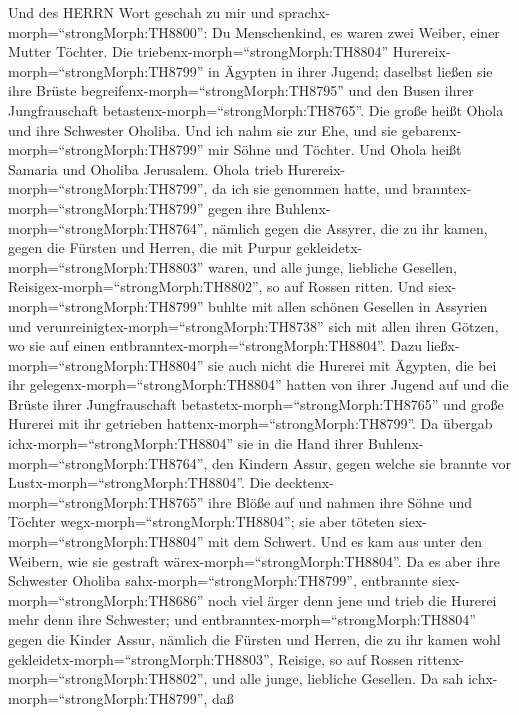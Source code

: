  Und des HERRN Wort geschah zu mir und
sprachx-morph=``strongMorph:TH8800'':  Du Menschenkind, es
waren zwei Weiber, einer Mutter Töchter.  Die
triebenx-morph=``strongMorph:TH8804''
Hurereix-morph=``strongMorph:TH8799'' in Ägypten in ihrer Jugend;
daselbst ließen sie ihre Brüste begreifenx-morph=``strongMorph:TH8795''
und den Busen ihrer Jungfrauschaft
betastenx-morph=``strongMorph:TH8765''.  Die große heißt
Ohola und ihre Schwester Oholiba. Und ich nahm sie zur Ehe, und sie
gebarenx-morph=``strongMorph:TH8799'' mir Söhne und Töchter. Und Ohola
heißt Samaria und Oholiba Jerusalem.  Ohola trieb
Hurereix-morph=``strongMorph:TH8799'', da ich sie genommen hatte, und
branntex-morph=``strongMorph:TH8799'' gegen ihre
Buhlenx-morph=``strongMorph:TH8764'', nämlich gegen die Assyrer, die zu
ihr kamen,  gegen die Fürsten und Herren, die mit Purpur
gekleidetx-morph=``strongMorph:TH8803'' waren, und alle junge, liebliche
Gesellen, Reisigex-morph=``strongMorph:TH8802'', so auf Rossen ritten.
 Und siex-morph=``strongMorph:TH8799'' buhlte mit allen
schönen Gesellen in Assyrien und
verunreinigtex-morph=``strongMorph:TH8738'' sich mit allen ihren Götzen,
wo sie auf einen entbranntex-morph=``strongMorph:TH8804''. 
Dazu ließx-morph=``strongMorph:TH8804'' sie auch nicht die Hurerei mit
Ägypten, die bei ihr gelegenx-morph=``strongMorph:TH8804'' hatten von
ihrer Jugend auf und die Brüste ihrer Jungfrauschaft
betastetx-morph=``strongMorph:TH8765'' und große Hurerei mit ihr
getrieben hattenx-morph=``strongMorph:TH8799''.  Da übergab
ichx-morph=``strongMorph:TH8804'' sie in die Hand ihrer
Buhlenx-morph=``strongMorph:TH8764'', den Kindern Assur, gegen welche
sie brannte vor Lustx-morph=``strongMorph:TH8804''.  Die
decktenx-morph=``strongMorph:TH8765'' ihre Blöße auf und nahmen ihre
Söhne und Töchter wegx-morph=``strongMorph:TH8804''; sie aber töteten
siex-morph=``strongMorph:TH8804'' mit dem Schwert. Und es kam aus unter
den Weibern, wie sie gestraft wärex-morph=``strongMorph:TH8804''.
 Da es aber ihre Schwester Oholiba
sahx-morph=``strongMorph:TH8799'', entbrannte
siex-morph=``strongMorph:TH8686'' noch viel ärger denn jene und trieb
die Hurerei mehr denn ihre Schwester;  und
entbranntex-morph=``strongMorph:TH8804'' gegen die Kinder Assur, nämlich
die Fürsten und Herren, die zu ihr kamen wohl
gekleidetx-morph=``strongMorph:TH8803'', Reisige, so auf Rossen
rittenx-morph=``strongMorph:TH8802'', und alle junge, liebliche
Gesellen.  Da sah ichx-morph=``strongMorph:TH8799'', daß
